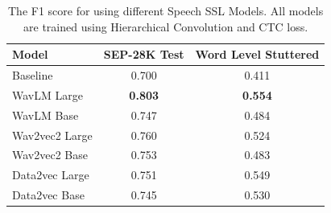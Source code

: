 \begin{table}
\centering
\small
\begin{tabular}{lcc}
\toprule
Model & SEP-28K Test & Word Level Stuttered 
\\
\midrule

Baseline~\cite{harvill22_interspeech} & 0.700 &	0.411 \\
WavLM Large & \textbf{0.803} &	\textbf{0.554} \\
WavLM Base & 0.747 &	0.484 \\
Wav2vec2 Large & 0.760 &	0.524 \\
Wav2vec2 Base & 0.753 &	0.483 \\
Data2vec Large & 0.751 &	0.549 \\
Data2vec Base & 0.745 &	0.530 \\



\bottomrule
\end{tabular}
\caption{The F1 score for using different Speech SSL Models. All models are trained using Hierarchical Convolution and CTC loss.}
\label{tab:different_ssl}
\vspace{-16pt}
\end{table}